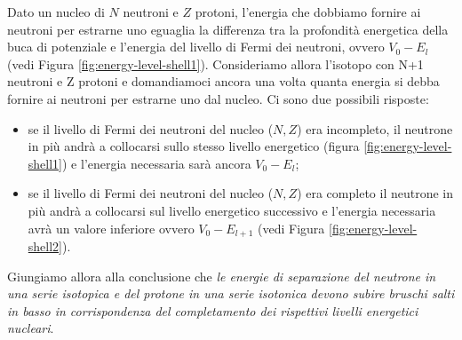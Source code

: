 Dato un nucleo di $N$ neutroni e $Z$ protoni, l’energia che dobbiamo fornire ai neutroni per estrarne uno eguaglia la differenza tra la profondità energetica della buca di potenziale e l’energia del livello di Fermi dei neutroni, ovvero $V_{0}-E_{l}$ (vedi Figura \ref{fig:energy-level-shell1}). Consideriamo allora l’isotopo con N+1 neutroni e Z protoni e domandiamoci ancora una volta quanta energia si debba fornire ai neutroni per estrarne uno dal nucleo. Ci sono due possibili risposte:
\begin{itemize}
	\item se il livello di Fermi dei neutroni del nucleo ($N, Z$) era incompleto, il neutrone in più andrà a collocarsi sullo stesso livello energetico (figura \ref{fig:energy-level-shell1}) e l’energia necessaria sarà ancora $V_{0}-E_{l}$;
    \item se il livello di Fermi dei neutroni del nucleo ($N, Z$) era completo il neutrone in più andrà a collocarsi sul livello energetico successivo e l’energia necessaria avrà un valore inferiore ovvero $V_0 - E_{l+1}$ (vedi Figura \ref{fig:energy-level-shell2}).
\end{itemize}

Giungiamo allora alla conclusione che \emph{le energie di separazione del neutrone in una serie isotopica e del protone in una serie isotonica devono subire bruschi salti in basso in corrispondenza del completamento dei rispettivi livelli energetici nucleari}.
\bigskip

